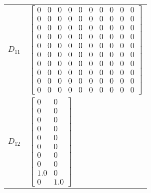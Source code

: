 \begin{tabular}{cl}
 $D_{11}$ & $\left[\begin{matrix}0 & 0 & 0 & 0 & 0 & 0 & 0 & 0 & 0 & 0\\0 & 0 & 0 & 0 & 0 & 0 & 0 & 0 & 0 & 0\\0 & 0 & 0 & 0 & 0 & 0 & 0 & 0 & 0 & 0\\0 & 0 & 0 & 0 & 0 & 0 & 0 & 0 & 0 & 0\\0 & 0 & 0 & 0 & 0 & 0 & 0 & 0 & 0 & 0\\0 & 0 & 0 & 0 & 0 & 0 & 0 & 0 & 0 & 0\\0 & 0 & 0 & 0 & 0 & 0 & 0 & 0 & 0 & 0\\0 & 0 & 0 & 0 & 0 & 0 & 0 & 0 & 0 & 0\\0 & 0 & 0 & 0 & 0 & 0 & 0 & 0 & 0 & 0\\0 & 0 & 0 & 0 & 0 & 0 & 0 & 0 & 0 & 0\end{matrix}\right]$                                                                                                                                                                                                                                                                                                                                                                                 \\
 $D_{12}$ & $\left[\begin{matrix}0 & 0\\0 & 0\\0 & 0\\0 & 0\\0 & 0\\0 & 0\\0 & 0\\0 & 0\\1.0 & 0\\0 & 1.0\end{matrix}\right]$                                                                                                                                                                                                                                                                                                                                                                                                                                                                                                                                                                                                                                                                                                             \\

\end{tabular}
